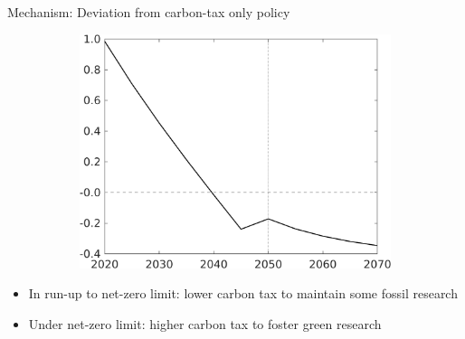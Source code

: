 \documentclass[11pt,aspectratio=169]{beamer}
\begin{document}
\begin{frame}{Mechanism: Deviation from carbon-tax only policy}
\begin{figure}[h!!]
\begin{subfigure}{0.4\textwidth}
	\includegraphics[width=1\textwidth]{../codding_model/own_basedOnFried/optimalPol_010922_revision/figures/all_13Sept22_Tplus30/sffsg_OPT_T_NoTaus_COMPtaulPer_regime4_spillover0_knspil0_noskill0_sep0_xgrowth0_PV1_etaa0.79.png}
\end{subfigure}
	\end{figure}
\pause
\begin{itemize}
\item In run-up to net-zero limit: lower carbon tax to maintain some fossil research
\item Under net-zero limit: higher carbon tax to foster green research %
\end{itemize}
\end{frame}
\end{document}
